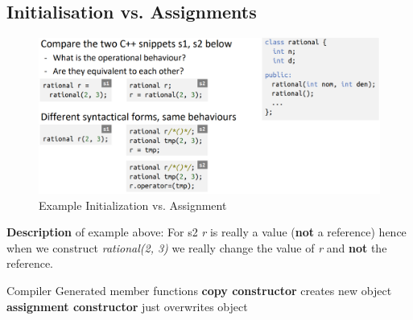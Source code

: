 \documentclass[a4paper,10pt]{article}
\begin{document}
\pagebreak
\subsection{Initialisation vs. Assignments}
\begin{figure}[h!]
    \centering
    \includegraphics[width=1\linewidth]{e13.png}
    \caption{Example Initialization vs. Assignment}
    \label{fig:enter-label}
\end{figure}
\textbf{Description} of example above: For s2 \textit{r} is really a value (\textbf{not} a reference) hence when we construct \textit{rational(2, 3)} we really change the value of \textit{r} and \textbf{not} the reference.
\begin{tipbox}
    {Compiler Generated member functions}
    \textbf{copy constructor} creates new object 
    \\\textbf{assignment constructor} just overwrites object
\end{tipbox}
\end{document}
